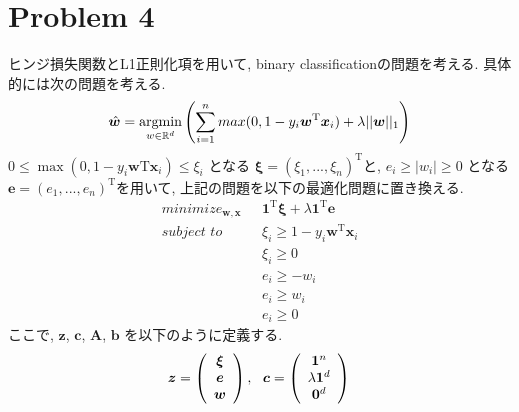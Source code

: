 \documentclass[a4paper,10pt]{jsarticle}
\newcommand{\argmin}{\mathop{\rm argmin}\limits}
\begin{document}
\section*{Problem 4}
ヒンジ損失関数とL1正則化項を用いて, binary classificationの問題を考える.
具体的には次の問題を考える.
\begin{equation}
 \hat{\bm{w}} = \argmin_{w \in \mathbb{R}^d}
  \left(\sum_{i=1}^{n}max(0, 1 - y_i\bm{w}^\mathrm{T}\bm{x}_i)
   + \lambda||\bm{w}||_1 \right)
\end{equation}
$0 \leq \max(0, 1 - y_i\bm{w}\mathrm{T}\bm{x}_i) \leq \xi_i$ となる
$\bm{\xi} = (\xi_1, ..., \xi_n)^\mathrm{T}$と,
$e_i \geq |w_i| \geq 0$ となる
$\bm{e} = (e_1, ..., e_n)^\mathrm{T}$を用いて,
上記の問題を以下の最適化問題に置き換える.
\begin{align*}
 minimize_{\bm{w}, \bm{x}} \,\,\,\,
 & \bm{1}^\mathrm{T}\bm{\xi} + \lambda\bm{1}^\mathrm{T}\bm{e}\\
 subject \,\, to \,\,\,\, &\xi_i \geq 1 - y_i\bm{w}^\mathrm{T}\bm{x}_i\\
 & \xi_i \geq 0\\
 & e_i \geq - w_i\\
 & e_i \geq w_i\\
 & e_i \geq 0
\end{align*}
ここで, $\bm{z}$, $\bm{c}$, $\bm{A}$, $\bm{b}$ を以下のように定義する.
\begin{equation*}
 \bm{z} = \left(\begin{array}{c} \bm{\xi} \\ \bm{e} \\ \bm{w} \end{array}\right), \,\,\,\,
 \bm{c} = \left(\begin{array}{c} \bm{1}^n \\ \lambda\bm{1}^d \\ \bm{0}^d\end{array}\right)\\
\end{equation*}
\end{document}
